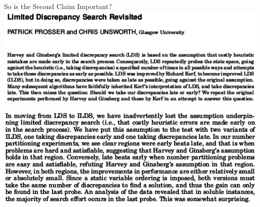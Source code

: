 \documentclass{beamer}
\begin{document}
\begin{frame}{So is the Second Claim Important?}
    \centering\includegraphics*[keepaspectratio=true,scale=0.4]{ldsr-paper.png}

    \vspace{2em}

    \centering\includegraphics*[keepaspectratio=true,scale=0.4]{ldsr-conclusion.png}

\end{frame}
\end{document}
